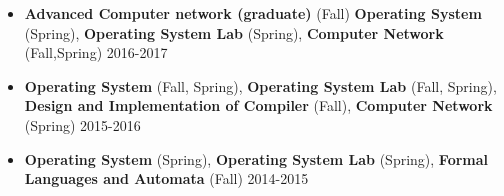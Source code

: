 \documentclass[a4paper,10pt]{article} %
\begin{document}
\begin{itemize}
	\item	
		\textbf{Advanced Computer network (graduate)} (Fall) 
		\textbf{Operating System} (Spring), 
		\textbf{Operating System Lab} (Spring), 
		\textbf{Computer Network} (Fall,Spring)
		\hfill {2016-2017}
	
	\item	
		\textbf {Operating System} (Fall, Spring), 
		\textbf {Operating System Lab} (Fall, Spring),	
		\textbf {Design and Implementation of Compiler} (Fall),
		\textbf {Computer Network} (Spring)
		\hfill {2015-2016}

	\item	
		\textbf {Operating System} (Spring), 
		\textbf {Operating System Lab} (Spring),	
		\textbf {Formal Languages and Automata} (Fall)
		\hfill {2014-2015}
	
	
\end{itemize}
\end{document}
